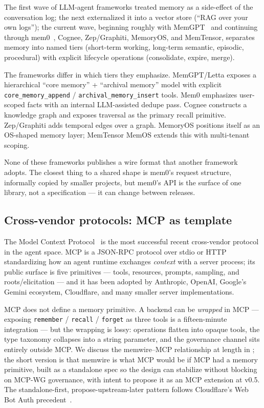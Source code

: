 \documentclass[11pt,letterpaper,twocolumn]{article}
\begin{document}
The first wave of LLM-agent frameworks treated memory as a side-effect of the conversation log; the next externalized it into a vector store (``RAG over your own logs''); the current wave, beginning roughly with MemGPT~\cite{packer2023memgpt} and continuing through mem0~\cite{chhikara2025mem0}, Cognee, Zep/Graphiti, MemoryOS, and MemTensor, separates memory into named tiers (short-term working, long-term semantic, episodic, procedural) with explicit lifecycle operations (consolidate, expire, merge).

The frameworks differ in which tiers they emphasize. MemGPT/Letta exposes a hierarchical ``core memory'' + ``archival memory'' model with explicit \texttt{core\_memory\_append} / \texttt{archival\_memory\_insert} tools. Mem0 emphasizes user-scoped facts with an internal LLM-assisted dedupe pass. Cognee constructs a knowledge graph and exposes traversal as the primary recall primitive. Zep/Graphiti adds temporal edges over a graph. MemoryOS positions itself as an OS-shaped memory layer; MemTensor MemOS extends this with multi-tenant scoping.

None of these frameworks publishes a wire format that another framework adopts. The closest thing to a shared shape is mem0's request structure, informally copied by smaller projects, but mem0's API is the surface of one library, not a specification --- it can change between releases.

\subsection{Cross-vendor protocols: MCP as template}

The Model Context Protocol~\cite{mcp_spec_2025} is the most successful recent cross-vendor protocol in the agent space. MCP is a JSON-RPC protocol over stdio or HTTP standardizing how an agent runtime exchanges \emph{context} with a server process; its public surface is five primitives --- tools, resources, prompts, sampling, and roots/elicitation --- and it has been adopted by Anthropic, OpenAI, Google's Gemini ecosystem, Cloudflare, and many smaller server implementations.

MCP does not define a memory primitive. A backend can be \emph{wrapped} in MCP --- exposing \texttt{remember} / \texttt{recall} / \texttt{forget} as three tools is a fifteen-minute integration --- but the wrapping is lossy: operations flatten into opaque tools, the type taxonomy collapses into a string parameter, and the governance channel sits entirely outside MCP. We discuss the memwire--MCP relationship at length in ; the short version is that memwire is what MCP would be if MCP had a memory primitive, built as a standalone spec so the design can stabilize without blocking on MCP-WG governance, with intent to propose it as an MCP extension at v0.5. The standalone-first, propose-upstream-later pattern follows Cloudflare's Web Bot Auth precedent~\cite{meunier2026webbotauth}.
\end{document}
